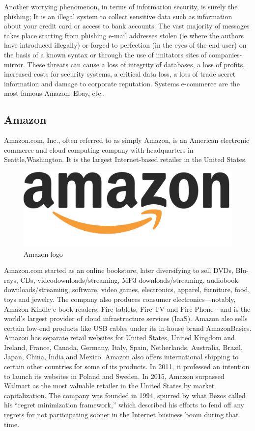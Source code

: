 Another worrying phenomenon, in terms of information security, is surely the phishing; It is an illegal system to collect sensitive data such as information about your credit card or access to bank accounts. The vast majority of messages takes place starting from phishing e-mail addresses stolen (ie where the authors have introduced illegally) or forged to perfection (in the eyes of the end user) on the basis of a known syntax or through the use of imitators sites of companies-mirror. These threats can cause a loss of integrity of databases, a loss of profits, increased costs for security systems, a critical data loss, a loss of trade secret information and damage to corporate reputation.
\newline
Systems e-commerce are the most famous Amazon, Ebay, etc..
\subsection{Amazon}
Amazon.com, Inc., often referred to as simply Amazon, is an American electronic commerce and cloud computing company with headquarters in Seattle,Washington. It is the largest Internet-based retailer in the United States.
\begin{figure}[htb]
 \centering
 \includegraphics[width=0.4\linewidth]{images/chapter1/amazon_logo.jpg}\hfill
 \caption[Amazon logo]{Amazon logo}
 \label{fig:amazon_logo}
\end{figure}
Amazon.com started as an online bookstore, later diversifying to sell DVDs, Blu-rays, CDs, videodownloads/streaming, MP3 downloads/streaming, audiobook downloads/streaming, software, video games, electronics, apparel, furniture, food, toys and jewelry. The company also produces consumer electronics—notably, Amazon Kindle e-book readers, Fire tablets, Fire TV and Fire Phone - and is the world's largest provider of cloud infrastructure services (IaaS). Amazon also sells certain low-end products like USB cables under its in-house brand AmazonBasics.
\newline
Amazon has separate retail websites for United States, United Kingdom and Ireland, France, Canada, Germany, Italy, Spain, Netherlands, Australia, Brazil, Japan, China, India and Mexico.
\newline
Amazon also offers international shipping to certain other countries for some of its products. In 2011, it professed an intention to launch its websites in Poland and Sweden.
In 2015, Amazon surpassed Walmart as the most valuable retailer in the United States by market capitalization.
The company was founded in 1994, spurred by what Bezos called his “regret minimization framework,” which described his efforts to fend off any regrets for not participating sooner in the Internet business boom during that time.
